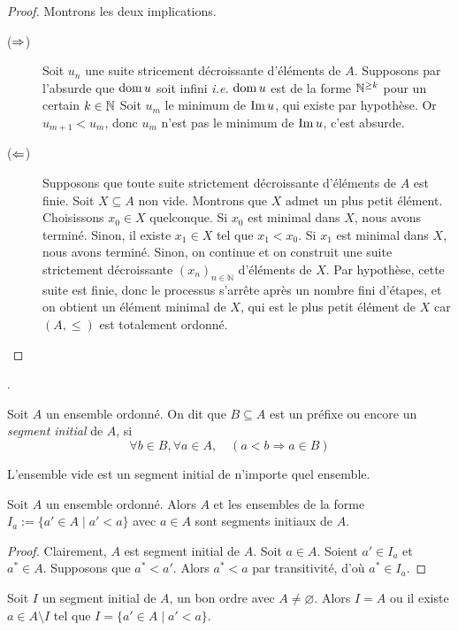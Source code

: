 \begin{proof}
Montrons les deux implications.
    \begin{description}
        \item[($\Rightarrow$)] Soit $u_n$ une suite stricement décroissante d'éléments de $A$. Supposons par l'absurde que $\operatorname{dom} u$ soit infini\textit{ i.e. }$\operatorname{dom} u$ est de la forme $\mathbb{N}^{\ge k}$ pour un certain $k\in \mathbb{N}$  Soit $u_m$ le minimum de $\operatorname{Im} u$, qui existe par hypothèse. Or $u_{m+1}<u_m$, donc $u_m$ n'est pas le minimum de $\operatorname{Im} u$, c'est absurde.
        \item[($\Leftarrow$)] 
        Supposons que toute suite strictement décroissante d'éléments de $A$ est finie. Soit $X \subseteq A$ non vide. Montrons que $X$ admet un plus petit élément. Choisissons $x_0 \in X$ quelconque. Si $x_0$ est minimal dans $X$, nous avons terminé. Sinon, il existe $x_1 \in X$ tel que $x_1 < x_0$. Si $x_1$ est minimal dans $X$, nous avons terminé. Sinon, on continue et on construit une suite strictement décroissante $(x_n)_{n \in \mathbb{N}}$ d'éléments de $X$. Par hypothèse, cette suite est finie, donc le processus s'arrête après un nombre fini d'étapes, et on obtient un élément minimal de $X$, qui est le plus petit élément de $X$ car $(A, \leq)$ est totalement ordonné.
    \end{description}
\end{proof}.
 


\begin{definition}
    Soit $A$ un ensemble ordonné. On dit que $B\subseteq A$ est un préfixe ou encore un \emph{segment initial} de $A$, si
    \begin{equation*}
        \forall b\in B, \forall a\in A, \quad (a<b\Rightarrow a\in B)
    \end{equation*}
\end{definition}
\begin{remarque}
    L'ensemble vide est un segment initial de n'importe quel ensemble.  
\end{remarque}
\begin{lemme}\label{ens : bo : segments_initiaux}
    Soit $A$ un ensemble ordonné. Alors $A$ et les ensembles de la forme $I_a:=\{a'\in A \mid a'<a\}$ avec $a\in A$ sont segments initiaux de $A$.
\end{lemme}
\begin{proof}
    Clairement, $A$ est segment initial de $A$. Soit $a\in A$. Soient $a'\in I_a$ et $a^*\in A$. Supposons que $a^*<a'$. Alors $a^*<a$ par transitivité, d'où $a^*\in I_a$. 
\end{proof}
\begin{lemme}\label{ens : bo : segm_init_bo}
    Soit $I$ un segment initial de $A$, un bon ordre avec $A\neq \varnothing$. Alors $I=A$ ou il existe $a\in A\setminus I$ tel que $I=\{a'\in A \mid a'<a\}$.
\end{lemme}

